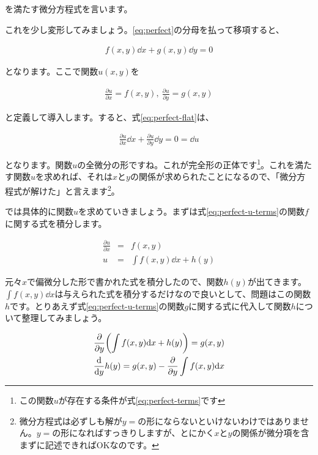 \noindent
を満たす微分方程式を言います。

これを少し変形してみましょう。\ref{eq:perfect}の分母を払って移項すると、

\begin{eqnarray}
    f(x,y)\dd x+g(x,y)\dd y=0
    \label{eq:perfect-flat}
\end{eqnarray}

\noindent
となります。ここで関数$u(x,y)$を

\begin{eqnarray}
    \frac{\partial u}{\partial x}=f(x,y),\ \frac{\partial u}{\partial y}=g(x,y)
    \label{eq:perfect-u-terms}
\end{eqnarray}

\noindent
と定義して導入します。すると、式\ref{eq:perfect-flat}は、

\begin{eqnarray}
    \frac{\partial u}{\partial x}\dd x+\frac{\partial u}{\partial y}\dd y=0=\dd u
\end{eqnarray}

となります。関数$u$の全微分の形ですね。これが完全形の正体です\footnote{この関数$u$が存在する条件が式\ref{eq:perfect-terms}です}。これを満たす関数$u$を求めれば、それは$x$と$y$の関係が求められたことになるので、「微分方程式が解けた」と言えます\footnote{微分方程式は必ずしも解が$y=$の形にならないといけないわけではありません。$y=$の形になればすっきりしますが、とにかく$x$と$y$の関係が微分項を含まずに記述できればOKなのです。}。

では具体的に関数$u$を求めていきましょう。まずは式\ref{eq:perfect-u-terms}の関数$f$に関する式を積分します。

\begin{eqnarray}
    \frac{\partial u}{\partial x}&=&f(x,y) \nonumber \\
    u&=&\int f(x,y) \dd x+h(y)
    \label{eq:perfect-ans-u}
\end{eqnarray}

\noindent
元々$x$で偏微分した形で書かれた式を積分したので、関数$h(y)$が出てきます。$\int f(x,y) \dd x$は与えられた式を積分するだけなので良いとして、問題はこの関数$h$です。とりあえず式\ref{eq:perfect-u-terms}の関数$g$に関する式に代入して関数$h$について整理してみましょう。

\begin{eqnarray}
    \frac{\partial}{\partial y}\pqty{\int f(x,y) \dd x+h(y)}=g(x,y) \\
    \frac{\dd }{\dd y}h(y)=g(x,y)-\frac{\partial}{\partial y}\int f(x,y) \dd x
    \label{eq:perfect-u}
\end{eqnarray}

